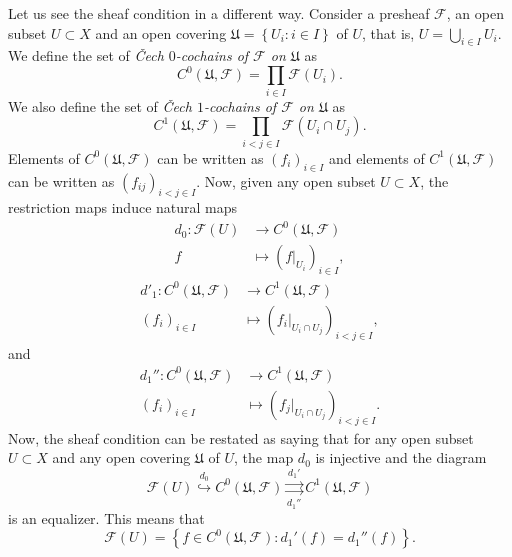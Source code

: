 \documentclass[12pt,a4paper]{article}
\begin{document}
  Let us see the sheaf condition in a different way. Consider a presheaf $\mathcal{F}$, an open subset $U\subset X$ and an open covering $\mathfrak{U}=\left\{ U_i: i \in I \right\}$ of $U$, that is, $U=\bigcup_{i \in I} U_i$. We define the set of \emph{\v{C}ech $0$-cochains of $\mathcal{F}$ on $\mathfrak{U}$} as
  \begin{equation*}
    C^0(\mathfrak{U},\mathcal{F})=\prod_{i \in I} \mathcal{F}(U_i).
  \end{equation*}
We also define the set of \emph{\v{C}ech $1$-cochains of $\mathcal{F}$ on $\mathfrak{U}$} as
  \begin{equation*}
    C^1(\mathfrak{U},\mathcal{F})=\prod_{i<j \in I} \mathcal{F}(U_i\cap U_j).
  \end{equation*}
  Elements of $C^0(\mathfrak{U},\mathcal{F})$ can be written as $(f_i)_{i\in I}$ and elements of $C^1(\mathfrak{U},\mathcal{F})$ can be written as $(f_{ij})_{i<j \in I}$. 
  Now, given any open subset $U\subset X$, the restriction maps induce natural maps
  \begin{align*}
    d_0: \mathcal{F}(U)&\longrightarrow C^0(\mathfrak{U},\mathcal{F})\\ 
    f &\longmapsto (f|_{U_i})_{i \in I}, 
    \end{align*}
  \begin{align*}
    d'_1: C^0(\mathfrak{U},\mathcal{F})&\longrightarrow C^1(\mathfrak{U},\mathcal{F})\\ 
    (f_{i})_{i \in I} &\longmapsto (f_i|_{U_i\cap U_j})_{i<j \in I} , 
    \end{align*}
    and
  \begin{align*}
    d_1'': C^0(\mathfrak{U},\mathcal{F})&\longrightarrow C^1(\mathfrak{U},\mathcal{F})\\ 
    (f_{i})_{i \in I} &\longmapsto (f_{j}|_{U_i \cap U_j})_{i<j \in I}.
    \end{align*}
    Now, the sheaf condition can be restated as saying that for any open subset $U\subset X$ and any open covering $\mathfrak{U}$ of $U$, the map $d_0$ is injective and the diagram
    \begin{equation*}
      \mathcal{F}(U) \overset{d_0}{\hookrightarrow} C^0(\mathfrak{U},\mathcal{F}) \underset{d_1''}{\overset{d_1'}{\rightrightarrows}} C^1(\mathfrak{U},\mathcal{F})
    \end{equation*}
    is an equalizer. This means that
    \begin{equation*}
      \mathcal{F}(U)= \left\{ f\in C^0(\mathfrak{U},\mathcal{F}): d_1'(f)=d_1''(f) \right\}.
    \end{equation*}
\end{document}

